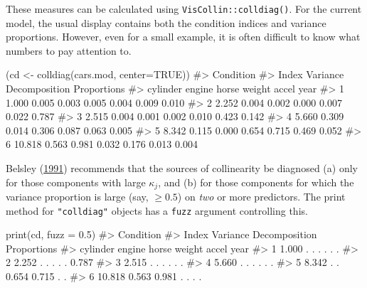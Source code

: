 \documentclass[
  letterpaper,
  10pt,
  krantz2]{krantz}
\makeatletter
\newenvironment{Shaded}{\begin{snugshade}}{\end{snugshade}}
\newcommand{\AttributeTok}[1]{\textcolor[rgb]{0.40,0.45,0.13}{#1}}
\newcommand{\CommentTok}[1]{\textcolor[rgb]{0.37,0.37,0.37}{#1}}
\newcommand{\ConstantTok}[1]{\textcolor[rgb]{0.56,0.35,0.01}{#1}}
\newcommand{\FloatTok}[1]{\textcolor[rgb]{0.68,0.00,0.00}{#1}}
\newcommand{\FunctionTok}[1]{\textcolor[rgb]{0.28,0.35,0.67}{#1}}
\newcommand{\NormalTok}[1]{\textcolor[rgb]{0.00,0.23,0.31}{#1}}
\newcommand{\OtherTok}[1]{\textcolor[rgb]{0.00,0.23,0.31}{#1}}
\newenvironment{kframe}{%
  \medskip{}
  \setlength{\fboxsep}{.8em}
  \def\at@end@of@kframe{}%
  \ifinner\ifhmode%
  \def\at@end@of@kframe{\end{minipage}}%
  \begin{minipage}{\columnwidth}%
  \fi\fi%
  \def\FrameCommand##1{\hskip\@totalleftmargin \hskip-\fboxsep
  \colorbox{shadecolor}{##1}\hskip-\fboxsep
      \hskip-\linewidth \hskip-\@totalleftmargin \hskip\columnwidth}%
  \MakeFramed {\advance\hsize-\width
    \@totalleftmargin\z@ \linewidth\hsize
    \@setminipage}}%
{\par\unskip\endMakeFramed%
  \at@end@of@kframe}
\renewenvironment{Shaded}{\begin{kframe}}{\end{kframe}}
\makeatother
\begin{document}
These measures can be calculated using \texttt{VisCollin::colldiag()}.
For the current model, the usual display contains both the condition
indices and variance proportions. However, even for a small example, it
is often difficult to know what numbers to pay attention to.

\begin{Shaded}
\begin{Highlighting}[]
\NormalTok{(cd }\OtherTok{\textless{}{-}} \FunctionTok{colldiag}\NormalTok{(cars.mod, }\AttributeTok{center=}\ConstantTok{TRUE}\NormalTok{))}
\CommentTok{\#\textgreater{} Condition}
\CommentTok{\#\textgreater{} Index    Variance Decomposition Proportions}
\CommentTok{\#\textgreater{}           cylinder engine horse weight accel year }
\CommentTok{\#\textgreater{} 1   1.000 0.005    0.003  0.005 0.004  0.009 0.010}
\CommentTok{\#\textgreater{} 2   2.252 0.004    0.002  0.000 0.007  0.022 0.787}
\CommentTok{\#\textgreater{} 3   2.515 0.004    0.001  0.002 0.010  0.423 0.142}
\CommentTok{\#\textgreater{} 4   5.660 0.309    0.014  0.306 0.087  0.063 0.005}
\CommentTok{\#\textgreater{} 5   8.342 0.115    0.000  0.654 0.715  0.469 0.052}
\CommentTok{\#\textgreater{} 6  10.818 0.563    0.981  0.032 0.176  0.013 0.004}
\end{Highlighting}
\end{Shaded}

Belsley (\protect\hyperlink{ref-Belsley:91a}{1991}) recommends that the
sources of collinearity be diagnosed (a) only for those components with
large \(\kappa_j\), and (b) for those components for which the variance
proportion is large (say, \(\ge 0.5\)) on \emph{two} or more predictors.
The print method for \texttt{"colldiag"} objects has a \texttt{fuzz}
argument controlling this.

\begin{Shaded}
\begin{Highlighting}[]
\FunctionTok{print}\NormalTok{(cd, }\AttributeTok{fuzz =} \FloatTok{0.5}\NormalTok{)}
\CommentTok{\#\textgreater{} Condition}
\CommentTok{\#\textgreater{} Index    Variance Decomposition Proportions}
\CommentTok{\#\textgreater{}           cylinder engine horse weight accel year }
\CommentTok{\#\textgreater{} 1   1.000  .        .      .     .      .     .   }
\CommentTok{\#\textgreater{} 2   2.252  .        .      .     .      .    0.787}
\CommentTok{\#\textgreater{} 3   2.515  .        .      .     .      .     .   }
\CommentTok{\#\textgreater{} 4   5.660  .        .      .     .      .     .   }
\CommentTok{\#\textgreater{} 5   8.342  .        .     0.654 0.715   .     .   }
\CommentTok{\#\textgreater{} 6  10.818 0.563    0.981   .     .      .     .}
\end{Highlighting}
\end{Shaded}
\end{document}
